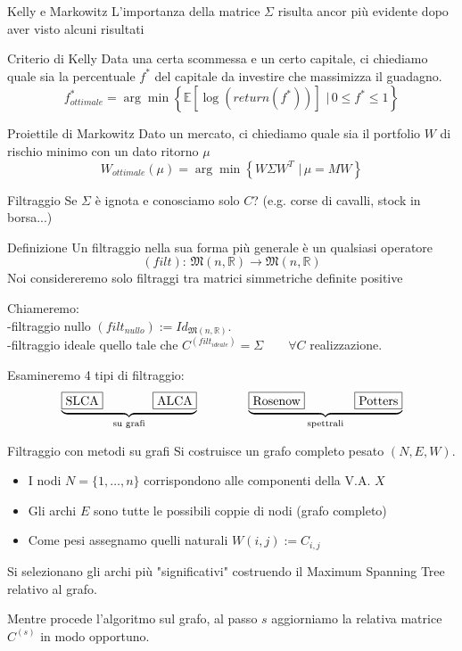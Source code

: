 \documentclass{beamer}
\newcommand{\bbR}{\mathbb{R}}
\newcommand{\1}{\mathbbm{1}}
\begin{document}
\begin{frame}{Kelly e Markowitz}
L'importanza della matrice $\Sigma$ risulta ancor più evidente dopo aver visto alcuni risultati

\pause
\begin{block}{Criterio di Kelly}
Data una certa scommessa e un certo capitale, ci chiediamo quale sia la percentuale $f^*$ del capitale da investire che massimizza il guadagno.
\[
f^*_{ottimale} = \arg\min \left\{\mathbb{E}[\log(return(f^*))] \,\,|\,0\leq f^*\leq1 \right\}
\]
\end{block}
\pause
\begin{block}{Proiettile di Markowitz}
Dato un mercato, ci chiediamo quale sia il portfolio $W$ di rischio minimo con un dato ritorno $\mu$
\[
W_{ottimale}(\mu) = \arg\min \left\{ W\Sigma W^T \,\,|\,\mu=MW \right\}
\]
\end{block}
\end{frame}


\begin{frame}{Filtraggio}
Se $\Sigma$ è ignota e conosciamo solo $C$? (e.g. corse di cavalli, stock in borsa...)

\pause
\begin{block}{Definizione}
Un filtraggio nella sua forma più generale è un qualsiasi operatore
\[
(filt):\,\mathfrak{M}(n,\bbR) \to \mathfrak{M}(n,\bbR)
\]
Noi considereremo solo filtraggi tra matrici simmetriche definite positive 
\end{block}
Chiameremo:\\
\quad -filtraggio nullo $(filt_{nullo}):=Id_{\mathfrak{M}(n,\bbR)}$.\\
\quad -filtraggio ideale quello tale che $C^{(filt_{ideale})}=\Sigma \qquad \forall C$ realizzazione.

\vspace{15pt}
\pause
Esamineremo 4 tipi di filtraggio:\\
\[
\underbrace{\fbox{SLCA} \qquad\qquad \fbox{ALCA}}_\text{su grafi}
 \qquad\qquad 
\underbrace{\fbox{Rosenow} \qquad\qquad \fbox{Potters}}_\text{spettrali}
\]
\end{frame}

\begin{frame}{Filtraggio con metodi su grafi}
Si costruisce un grafo completo pesato $(N,E,W)$.
\begin{itemize}
\item I nodi $N=\{1,\dots,n\}$ corrispondono alle componenti della V.A. $X$
\item Gli archi $E$ sono tutte le possibili coppie di nodi (grafo completo)
\item Come pesi assegnamo quelli naturali $W(i,j):=C_{i,j}$
\end{itemize}
\vspace{20pt}\pause
Si selezionano gli archi più "significativi" costruendo il Maximum Spanning Tree relativo al grafo.

\vspace{20pt}\pause
Mentre procede l'algoritmo sul grafo, al passo $s$ aggiorniamo la relativa matrice $C^{(s)}$ in modo opportuno.
\end{frame}
\end{document}
